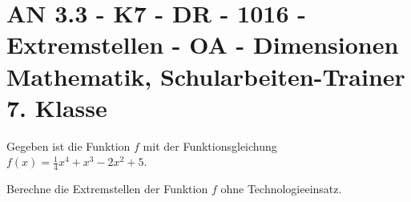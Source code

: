 \section{AN 3.3 - K7 - DR - 1016 - Extremstellen - OA - Dimensionen Mathematik, Schularbeiten-Trainer 7. Klasse}

\begin{beispiel}[K7 - DR]{1} %
Gegeben ist die Funktion $f$ mit der Funktionsgleichung $f(x)=\frac{1}{4}x^4+x^3-2x^2+5$.

Berechne die Extremstellen der Funktion $f$ ohne Technologieeinsatz.\leer

				
				\end{beispiel}